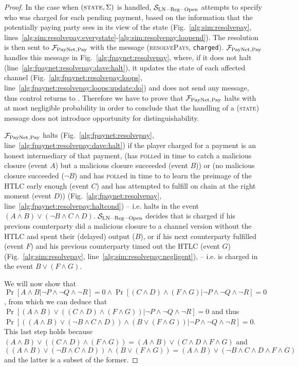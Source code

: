\begin{proof}
  In the case when $\left(\textsc{state}, \Sigma\right)$ is handled,
  $\mathcal{S}_{\mathrm{LN - Reg - Open}}$ attempts to specify who was charged
  for each pending payment, based on the information that the potentially paying
  party sees in its view of the \ledger{} state (Fig.~\ref{alg:sim:resolvepay},
  lines~\ref{alg:sim:resolvepay:everystate}-\ref{alg:sim:resolvepay:loopend}).
  The resolution is then sent to $\mathcal{F}_{\mathrm{PayNet}}{}_{\mathrm{, Pay}}$ with the message
  (\textsc{resolvePays}, \texttt{charged}). $\mathcal{F}_{\mathrm{PayNet}}{}_{\mathrm{, Pay}}$
  handles this message in Fig.~\ref{alg:fpaynet:resolvepay}, where, if it does
  not halt (line~\ref{alg:fpaynet:resolvepay:dave:halt}), it updates the state
  of each affected channel (Fig.~\ref{alg:fpaynet:resolvepay:loops},
  line~\ref{alg:fpaynet:resolvepay:loops:update:do}) and does not send any
  message, thus control returns to \environment. Therefore we have to prove that
  $\mathcal{F}_{\mathrm{PayNet}}{}_{\mathrm{, Pay}}$ halts with at most negligible probability in
  order to conclude that the handling of a (\textsc{state}) message does not
  introduce opportunity for distinguishability.

  $\mathcal{F}_{\mathrm{PayNet}}{}_{\mathrm{, Pay}}$ halts (Fig.~\ref{alg:fpaynet:resolvepay},
  line~\ref{alg:fpaynet:resolvepay:dave:halt}) if the player \dave{} charged for
  a payment is an honest intermediary of that payment, (has \textsc{poll}ed in
  time to catch a malicious closure (event $A$) but a malicious closure
  succeeded (event $B$)) or (no malicious closure succeeded ($\neg B$) and
  \dave{} has \textsc{poll}ed in time to to learn the preimage of the HTLC early
  enough (event $C$) and has attempted to fulfill on chain at the right moment
  (event $D$)) (Fig.~\ref{alg:fpaynet:resolvepay},
  line~\ref{alg:fpaynet:resolvepay:haltcond}) -- i.e. halts in the event $(A
  \wedge B) \vee (\neg B \wedge C \wedge D)$. $\mathcal{S}_{\mathrm{LN - Reg -
  Open}}$ decides that \dave{} is charged if his previous counterparty did a
  malicious closure to a channel version without the HTLC and spent their
  (delayed) output ($B$), or if his next counterparty fulfilled (event $F$) and
  his previous counterparty timed out the HTLC (event $G$)
  (Fig.~\ref{alg:sim:resolvepay}, line~\ref{alg:sim:resolvepay:negligent}), --
  i.e. \dave{} is charged in the event $B \vee (F \wedge G)$.

  We will now show that $\Pr[A \wedge B | \neg P \wedge \neg Q \wedge \neg R] =
  0 \wedge \Pr[(C \wedge D) \wedge (F \wedge G) | \neg P \wedge \neg Q \wedge
  \neg R] = 0$, from which we can deduce that $\Pr[(A \wedge B) \vee ((C \wedge
  D) \wedge (F \wedge G)) | \neg P \wedge \neg Q \wedge \neg R] = 0$ and thus
  $\Pr[((A \wedge B) \vee (\neg B \wedge C \wedge D)) \wedge (B \vee (F \wedge
  G)) | \neg P \wedge \neg Q \wedge \neg R] = 0$. This last step holds because
  $(A \wedge B) \vee ((C \wedge D) \wedge (F \wedge G)) = (A \wedge B) \vee (C
  \wedge D \wedge F \wedge G)$ and $((A \wedge B) \vee (\neg B \wedge C \wedge
  D)) \wedge (B \vee (F \wedge G)) = (A \wedge B) \vee (\neg B \wedge C \wedge D
  \wedge F \wedge G)$ and the latter is a subset of the former.


\end{proof}
